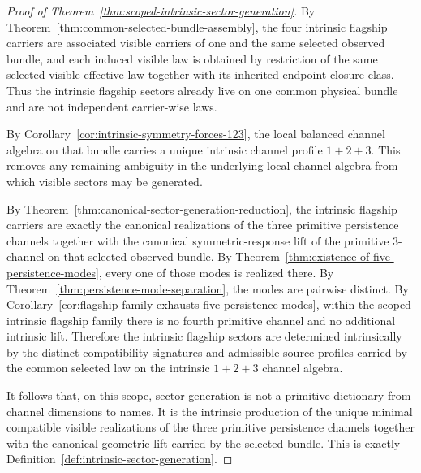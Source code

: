 \begin{proof}[Proof of Theorem~\ref{thm:scoped-intrinsic-sector-generation}]
\label{proof:thm:scoped-intrinsic-sector-generation}
By Theorem~\ref{thm:common-selected-bundle-assembly}, the four intrinsic
flagship carriers are associated visible carriers of one and the same selected
observed bundle, and each induced visible law is obtained by restriction of
the same selected visible effective law together with its inherited endpoint
closure class. Thus the intrinsic flagship sectors already live on one common
physical bundle and are not independent carrier-wise laws.

By Corollary~\ref{cor:intrinsic-symmetry-forces-123}, the local balanced
channel algebra on that bundle carries a unique intrinsic channel profile
\(1+2+3\). This removes any remaining ambiguity in the underlying local
channel algebra from which visible sectors may be generated.

By Theorem~\ref{thm:canonical-sector-generation-reduction}, the intrinsic
flagship carriers are exactly the canonical realizations of the three
primitive persistence channels together with the canonical symmetric-response
lift of the primitive \(3\)-channel on that selected observed bundle. By
Theorem~\ref{thm:existence-of-five-persistence-modes}, every one of those modes
is realized there. By Theorem~\ref{thm:persistence-mode-separation}, the modes
are pairwise distinct. By
Corollary~\ref{cor:flagship-family-exhausts-five-persistence-modes}, within the
scoped intrinsic flagship family there is no fourth primitive channel and no
additional intrinsic lift.
Therefore the intrinsic flagship sectors are determined intrinsically by the
distinct compatibility signatures and admissible source profiles carried by the
common selected law on the intrinsic \(1+2+3\) channel algebra.

It follows that, on this scope, sector generation is not a primitive dictionary
from channel dimensions to names. It is the intrinsic production of the unique
minimal compatible visible realizations of the three primitive persistence
channels together with the canonical geometric lift carried by the selected
bundle. This is exactly
Definition~\ref{def:intrinsic-sector-generation}.
\end{proof}

